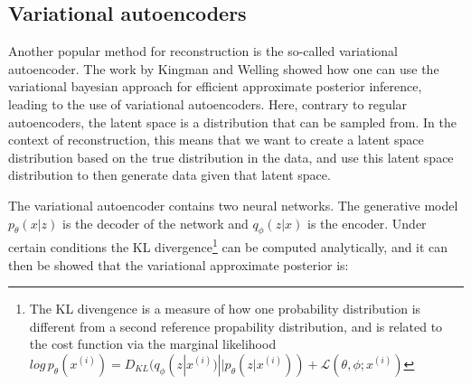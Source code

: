 \subsection{Variational autoencoders}
Another popular method for reconstruction is the so-called variational autoencoder. The work by Kingman and Welling \cite{VAE} showed how
one can use the variational bayesian approach for efficient approximate posterior inference, leading to the use of variational autoencoders.
Here, contrary to regular autoencoders, the latent space is a distribution that can be sampled from. In the context of reconstruction, this means that
we want to create a latent space distribution based on the true distribution in the data, and use this latent space distribution to then generate
data given that latent space. \par
The variational autoencoder contains two neural networks. The generative model $p_{\theta}(x|z)$ is the decoder of the network and 
$q_{\phi}(z|x)$ is the encoder. 
Under certain conditions\cite{VAE} the KL divergence\footnote{The KL divengence is a measure of how one probability distribution is different from a second reference propability distribution, and is related to the cost function via the marginal likelihood $log\, p_{\theta}(x^{(i)}) = D_{KL}(q_{\phi}(z|x^{(i)})||p_{\theta}(z|x^{(i)})) + \mathcal{L}(\theta, \phi;x^{(i)})$} can be computed analytically, and it 
can then be showed\cite{VAE} that the variational approximate posterior is:

